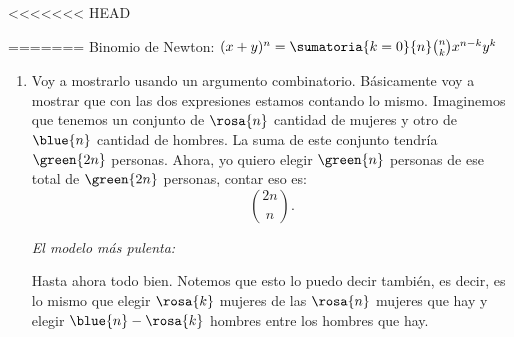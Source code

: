 <<<<<<< HEAD
\begin{enumerate}[label=\alph*)]
=======
Binomio de Newton: $(x + y)^n = \sumatoria{k=0}{n} \binom{n}{k} x^{n-k} y^k$

\begin{enumerate}[label=\roman*)]
>>>>>>> 4d34097 (agrego mas ejercicios de la guia 3)
  \item
        Voy a mostrarlo usando un argumento combinatorio. Básicamente voy a mostrar que con las dos expresiones estamos contando lo mismo.
        Imaginemos que tenemos un conjunto de $\rosa{n}$ cantidad de mujeres y otro de $\blue{n}$ cantidad de hombres.
        La suma de este conjunto tendría $\green{2n}$ personas. Ahora, yo quiero elegir $\green{n}$ personas de ese total
        de $\green{2n}$ personas, contar eso es:
        $$
          \binom{2n}{n}.
        $$

        \bigskip


        \bigskip

        \textit{El modelo más pulenta:}

        Hasta ahora todo bien. Notemos que esto lo puedo decir también, es decir, es lo mismo que elegir
        $\rosa{k}$ mujeres de las $\rosa{n}$ mujeres que hay y elegir $\blue{n} - \rosa{k}$ hombres entre los  hombres que hay.


\end{enumerate}
\end{enumerate}
